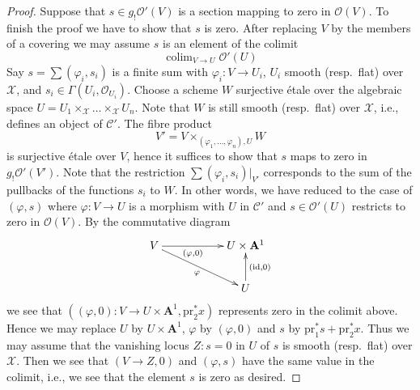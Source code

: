 \documentclass[10pt,a4paper]{amsart}
\theoremstyle{plain}
\theoremstyle{definition}
\theoremstyle{remark}
\numberwithin{equation}{subsection}
\def\colim{\mathop{\mathrm{colim}}\nolimits}
\begin{document}
\begin{proof}
\medskip\noindent
Suppose that $s \in g_!\mathcal{O}'(V)$ is a section
mapping to zero in $\mathcal{O}(V)$. To finish the proof we have to show
that $s$ is zero. After replacing $V$ by the members
of a covering we may assume $s$ is an element of the colimit
$$
\colim_{V \to U} \mathcal{O}'(U)
$$
Say $s = \sum (\varphi_i, s_i)$ is a finite sum with
$\varphi_i : V \to U_i$, $U_i$ smooth (resp.\ flat) over $\mathcal{X}$, and
$s_i \in \Gamma(U_i, \mathcal{O}_{U_i})$. Choose a scheme $W$ surjective
\'etale over the algebraic space
$U = U_1 \times_\mathcal{X} \ldots \times_\mathcal{X} U_n$.
Note that $W$ is still smooth (resp.\ flat) over $\mathcal{X}$, i.e.,
defines an object of $\mathcal{C}'$. The fibre product
$$
V' = V \times_{(\varphi_1, \ldots, \varphi_n), U} W
$$
is surjective \'etale over $V$, hence it suffices to show that $s$ maps
to zero in $g_!\mathcal{O}'(V')$. Note that the restriction
$\sum (\varphi_i, s_i)|_{V'}$ corresponds to the sum of the pullbacks
of the functions $s_i$ to $W$. In other words, we have reduced to the case
of $(\varphi, s)$ where $\varphi : V \to U$ is a morphism with $U$ in
$\mathcal{C}'$ and $s \in \mathcal{O}'(U)$ restricts to zero in
$\mathcal{O}(V)$. By the commutative diagram
$$
\xymatrix{
V \ar[rr]_-{(\varphi, 0)} \ar[rrd]_\varphi & & U \times \mathbf{A}^1 \\
& & U \ar[u]_{(\text{id}, 0)}
}
$$
we see that
$((\varphi, 0) : V \to U \times \mathbf{A}^1, \text{pr}_2^*x)$
represents zero in the colimit above. Hence we may
replace $U$ by $U \times \mathbf{A}^1$, $\varphi$ by $(\varphi, 0)$
and $s$ by $\text{pr}_1^*s + \text{pr}_2^*x$. Thus we may assume that
the vanishing locus $Z : s = 0$ in $U$ of $s$ is smooth (resp.\ flat)
over $\mathcal{X}$. Then we see that $(V \to Z, 0)$ and $(\varphi, s)$
have the same value in the colimit, i.e., we see that the element $s$
is zero as desired.
\end{proof}
\end{document}
